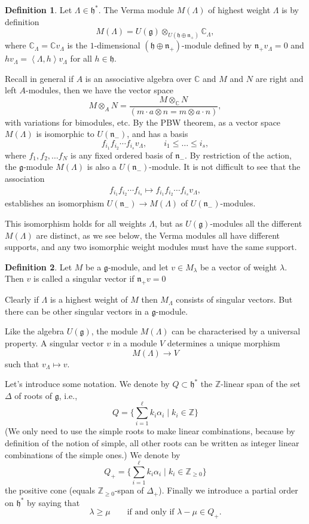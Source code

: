 \documentclass[12pt]{article}
\theoremstyle{plain}
\theoremstyle{definition}
\newtheorem{defn}{Definition}[section]
\numberwithin{equation}{section}
\newcommand{\al}{\alpha}
\newcommand{\la}{\lambda}
\newcommand{\La}{\Lambda}
\newcommand{\D}{\Delta}
\newcommand{\C}{\mathbb{C}}
\newcommand{\Z}{\mathbb{Z}}
\newcommand{\g}{\mathfrak{g}}
\newcommand{\h}{\mathfrak{h}}
\newcommand{\n}{\mathfrak{n}}
\begin{document}
\begin{defn}
Let $\Lambda \in \h^*$. The Verma module $M(\Lambda)$ of highest weight $\Lambda$ is by definition
\[
M(\La) = U(\g) \otimes_{U(\h \oplus \n_+)} \C_\La,
\]
where $\C_\La = \C v_\Lambda$ is the $1$-dimensional $(\h \oplus \n_+)$-module defined by $\n_+ v_\La = 0$ and $h v_\La = \left<\La, h\right> v_\La$ for all $h \in \h$.
\end{defn}

Recall in general if $A$ is an associative algebra over $\C$ and $M$ and $N$ are right and left $A$-modules, then we have the vector space
\[
M \otimes_A N = \frac{M \otimes_\C N}{(m \cdot a \otimes n = m \otimes a \cdot n)},
\]
with variations for bimodules, etc. By the PBW theorem, as a vector space $M(\La)$ is isomorphic to $U(\n_-)$, and has a basis
\[
f_{i_1} f_{i_2} \cdots f_{i_s} v_\Lambda, \qquad i_1 \leq \ldots \leq i_s,
\]
where $f_1, f_2, \ldots f_N$ is any fixed ordered basis of $\n_-$. By restriction of the action, the $\g$-module $M(\La)$ is also a $U(\n_-)$-module. It is not difficult to see that the association
\begin{align}\label{eq:Un-.basis}
f_{i_1} f_{i_2} \cdots f_{i_s} \mapsto f_{i_1} f_{i_2} \cdots f_{i_s} v_\Lambda,
\end{align}
establishes an isomorphism $U(\n_-) \rightarrow M(\La)$ of $U(\n_-)$-modules.

This isomorphism holds for all weights $\La$, but as $U(\g)$-modules all the different $M(\La)$ are distinct, as we see below, the Verma modules all have different supports, and any two isomorphic weight modules must have the same support.


\begin{defn}
Let $M$ be a $\g$-module, and let $v \in M_\la$ be a vector of weight $\lambda$. Then $v$ is called a singular vector if $\n_+ v = 0$
\end{defn}
Clearly if $\La$ is a highest weight of $M$ then $M_\La$ consists of singular vectors. But there can be other singular vectors in a $\g$-module.

Like the algebra $U(\g)$, the module $M(\La)$ can be characterised by a universal property. A singular vector $v$  in a module $V$ determines a unique morphism
\[
M(\Lambda) \rightarrow V
\]
such that $v_\Lambda \mapsto v$.

Let's introduce some notation. We denote by $Q \subset \h^*$ the $\Z$-linear span of the set $\D$ of roots of $\g$, i.e.,
\[
Q = \{\sum_{i=1}^\ell k_i \al_i \mid k_i \in \Z\}
\]
(We only need to use the simple roots to make linear combinations, because by definition of the notion of simple, all other roots can be written as integer linear combinations of the simple ones.) We denote by
\[
Q_+ = \{\sum_{i=1}^\ell k_i \al_i \mid k_i \in \Z_{\geq 0}\}
\]
the positive cone (equals $\Z_{\geq 0}$-span of $\D_+$). Finally we introduce a partial order on $\h^*$ by saying that
\[
\la \geq \mu \qquad \text{if and only if $\la - \mu \in Q_+$}.
\]
\end{document}
